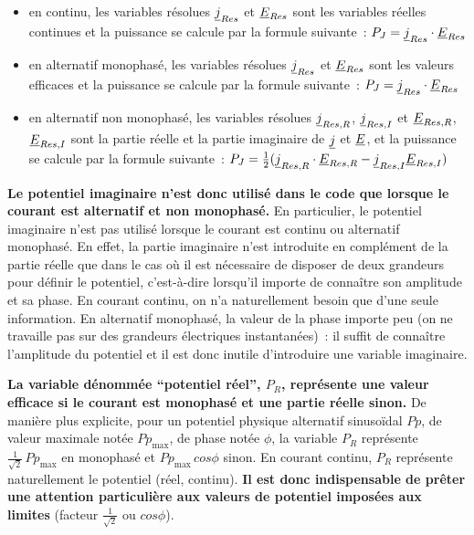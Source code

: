 \begin{itemize}
  \begin{itemize}
  \item en continu, les variables résolues
$\underline{j}_{Res}$ et $\underline{E}_{Res}$
sont les variables réelles continues
et la puissance se calcule par la formule suivante~:
$P_J=\underline{j}_{Res}\cdot\underline{E}_{Res}$
  \item en alternatif monophasé, les variables résolues
$\underline{j}_{Res}$ et $\underline{E}_{Res}$
sont les valeurs efficaces
et la puissance se calcule par la formule suivante~:
$P_J=\underline{j}_{Res}\cdot\underline{E}_{Res}$
  \item en alternatif non monophasé, les variables résolues
$\underline{j}_{Res,R}$, $\underline{j}_{Res,I}$ et $\underline{E}_{Res,R}$, $\underline{E}_{Res,I}$
sont la partie réelle et la partie imaginaire de $\underline{j}$ et $\underline{E}$,
et la puissance se calcule par la formule suivante~:
$P_J=\frac{1}{2}(\underline{j}_{Res,R}\cdot\underline{E}_{Res,R}-\underline{j}_{Res,I}\underline{E}_{Res,I})$
  \end{itemize}

\end{itemize}


{\bf Le potentiel imaginaire n'est donc utilisé dans le code que lorsque
le courant est alternatif et non monophasé.}
En particulier, le potentiel imaginaire n'est pas utilisé lorsque le courant est
continu ou alternatif monophasé.
En effet, la partie imaginaire n'est introduite en complément de la partie
réelle que dans le cas où il est nécessaire de disposer de deux grandeurs
pour définir le potentiel, c'est-à-dire lorsqu'il importe de connaître son
amplitude et sa phase.
En courant continu, on n'a naturellement besoin que d'une seule information. En
alternatif monophasé, la valeur de la phase importe peu
(on ne travaille pas sur des grandeurs électriques instantanées)~:
il suffit de connaître l'amplitude du potentiel et il est donc inutile
d'introduire une variable imaginaire.


{\bf La variable dénommée ``potentiel réel'', $P_R$, représente une
valeur efficace
si le courant est monophasé et une partie réelle sinon.}
De manière plus explicite, pour un potentiel physique alternatif sinuso\"idal
$Pp$, de valeur maximale notée $Pp_\text{max}$, de phase notée $\phi$, la
variable $P_R$ représente $\frac{1}{\sqrt{2}}\,Pp_\text{max}$ en
monophasé et $Pp_\text{max}\,cos\phi$ sinon. En courant continu, $P_R$
représente naturellement le potentiel (réel, continu).
{\bf Il est donc indispensable de prêter une attention particulière aux
valeurs de potentiel imposées aux limites} (facteur $\frac{1}{\sqrt{2}}$ ou
$cos\phi$).


